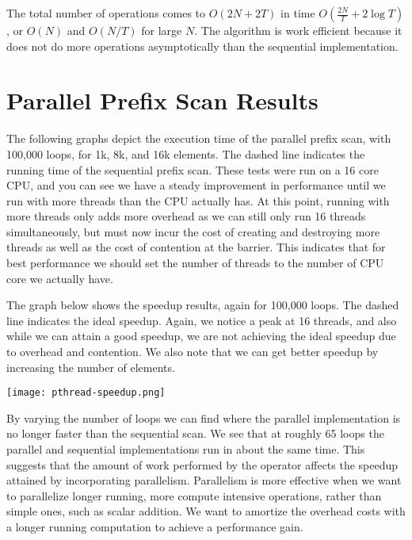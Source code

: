 \documentclass{article}
\begin{document}
The total number of operations comes to $O(2N + 2T)$ in time
$O(\frac{2N}{T} + 2\log{T})$, or $O(N)$ and $O(N/T)$ for large $N$.
The algorithm is work efficient because it does not do more operations
asymptotically than the sequential implementation.

\section{Parallel Prefix Scan Results}

The following graphs depict the execution time of the parallel prefix scan,
with 100,000 loops, for 1k, 8k, and 16k elements.
The dashed line indicates the running time of the sequential prefix scan.
These tests were run on a 16 core CPU, and you can see we have a steady
improvement in performance until we run with more threads than the CPU actually
has.
At this point, running with more threads only adds more overhead as we can
still only run 16 threads simultaneously, but must now incur the cost of
creating and destroying more threads as well as the cost of contention at the
barrier.
This indicates that for best performance we should set the number of threads to
the number of CPU core we actually have.

\begin{figure}[float=htbp]
  
  
\end{figure}
\begin{center}
  
\end{center}

The graph below shows the speedup results, again for 100,000 loops.
The dashed line indicates the ideal speedup.
Again, we notice a peak at 16 threads, and also while we can attain a good
speedup, we are not achieving the ideal speedup due to overhead and contention.
We also note that we can get better speedup by increasing the number of
elements.

%  
\begin{center}
  \texttt{[image: pthread-speedup.png]}
\end{center}

By varying the number of loops we can find where the parallel implementation is
no longer faster than the sequential scan.
We see that at roughly 65 loops the parallel and sequential implementations run
in about the same time.
This suggests that the amount of work performed by the operator affects the
speedup attained by incorporating parallelism.
Parallelism is more effective when we want to parallelize longer running, more
compute intensive operations, rather than simple ones, such as scalar addition.
We want to amortize the overhead costs with a longer running computation to
achieve a performance gain.
\end{document}
